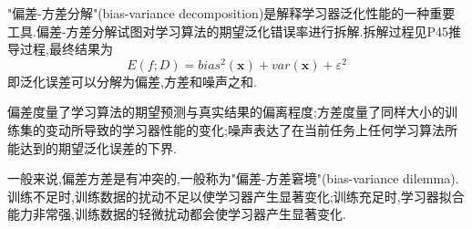 "偏差-方差分解"(bias-variance decomposition)是解释学习器泛化性能的一种重要工具.偏差-方差分解试图对学习算法的期望泛化错误率进行拆解.拆解过程见P45推导过程,最终结果为
\begin{equation}
E(f;D)=bias^2(\mathbf x)+var(\mathbf x)+\varepsilon^2
\end{equation}
即泛化误差可以分解为偏差,方差和噪声之和.

偏差度量了学习算法的期望预测与真实结果的偏离程度;方差度量了同样大小的训练集的变动所导致的学习器性能的变化;噪声表达了在当前任务上任何学习算法所能达到的期望泛化误差的下界.

一般来说,偏差方差是有冲突的,一般称为"偏差-方差窘境"(bias-variance dilemma).训练不足时,训练数据的扰动不足以使学习器产生显著变化;训练充足时,学习器拟合能力非常强,训练数据的轻微扰动都会使学习器产生显著变化.